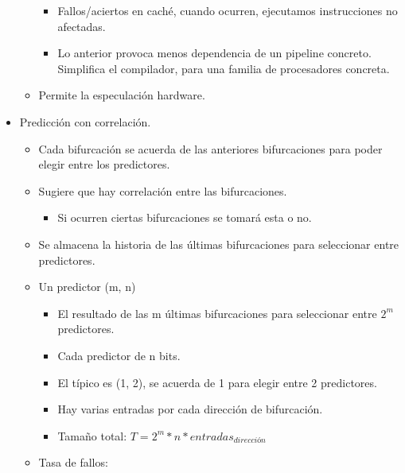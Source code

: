 \documentclass[12pt, twoside, openright]{report} %
\begin{document}
\begin{itemize}
\begin{itemize}
\begin{itemize}
			            \item Fallos/aciertos en caché, cuando ocurren, ejecutamos
			                  instrucciones no afectadas.
			            \item Lo anterior provoca menos dependencia de un pipeline concreto.
			                  Simplifica el compilador, para una familia de procesadores
			                  concreta.
		            \end{itemize}
		      \item Permite la especulación hardware.
	      \end{itemize}
	\item Predicción con correlación.

	      \begin{itemize}

		      \item Cada bifurcación se acuerda de las anteriores bifurcaciones para
		            poder elegir entre los predictores.
		      \item Sugiere que hay correlación entre las bifurcaciones.

		            \begin{itemize}

			            \item Si ocurren ciertas bifurcaciones se tomará esta o no.
		            \end{itemize}
		      \item Se almacena la historia de las últimas bifurcaciones para
		            seleccionar entre predictores.
		      \item Un predictor (m, n)

		            \begin{itemize}

			            \item El resultado de las m últimas bifurcaciones para seleccionar
			                  entre \(2^m\) predictores.
			            \item Cada predictor de n bits.
			            \item El típico es (1, 2), se acuerda de 1 para elegir entre 2
			                  predictores.
			            \item Hay varias entradas por cada dirección de bifurcación.
			            \item Tamaño total: \(T = 2^m*n*entradas_{dirección}\)
		            \end{itemize}
		      \item Tasa de fallos:


\end{itemize}
\end{itemize}
\end{document}
